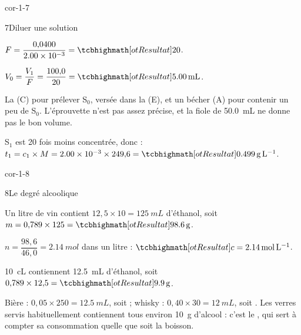 \begin{blocLivre}{cor-1-7}
\begin{corrige}{7}{Diluer une solution}
\begin{questions}
\item $F=\dfrac{0{,}0400}{\num{2.00e-3}}=\res{20}$.
\item $V_0=\dfrac{V_1}{F}=\dfrac{100{,}0}{20}=\res{\qty{5,00}{mL}}$.
\item La  (C) pour prélever S$_0$, versée dans la  (E), et un bécher (A) pour
contenir un peu de S$_0$. L'éprouvette n'est pas assez précise, et la fiole de \qty{50,0}{mL} ne donne pas le bon volume.
\item S$_1$ est 20 fois moins concentrée, donc  : $t_1=c_1\times M=\num{2.00e-3}\times249{,}6=\res{\qty{0,499}{g.L^{-1}}}$.
\end{questions}
\end{corrige}
\end{blocLivre}
\begin{blocLivre}{cor-1-8}
\begin{corrige}{8}{Le degré alcoolique}
\begin{questions}
\item Un litre de vin contient $12{,}5\times10=\qty{125}{mL}$ d'éthanol, soit $m=0{,}789\times125=\res{\qty{98,6}{g}}$.
\item $n=\dfrac{98{,}6}{46{,}0}=\qty{2,14}{mol}$ dans un litre : $\res{c=\qty{2,14}{mol.L^{-1}}}$.
\item \qty{10}{cL} contiennent \qty{12,5}{mL} d'éthanol, soit $0{,}789\times12{,}5=\res{\qty{9,9}{g}}$.
\item Bière : $0{,}05\times250=\qty{12,5}{mL}$, soit  ; whisky : $0{,}40\times30=\qty{12}{mL}$, soit . Les verres servis
habituellement contiennent tous environ \qty{10}{g} d'alcool : c'est le , qui sert à compter sa consommation quelle
que soit la boisson.
\end{questions}
\end{corrige}
\end{blocLivre}
